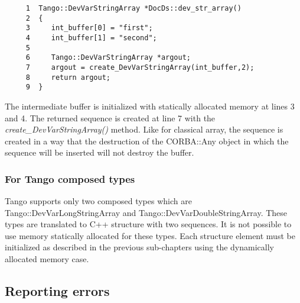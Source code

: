 \begin{verbatim}
     1  Tango::DevVarStringArray *DocDs::dev_str_array()
     2  {
     3     int_buffer[0] = "first";
     4     int_buffer[1] = "second";
     5  
     6     Tango::DevVarStringArray *argout;
     7     argout = create_DevVarStringArray(int_buffer,2);
     8     return argout;
     9  }
\end{verbatim}


The intermediate buffer is initialized with statically allocated memory
at lines 3 and 4. The returned sequence is created at line 7 with
the \emph{create\_DevVarStringArray()}
method. Like for classical array, the sequence is created in a way
that the destruction of the CORBA::Any object in which
the sequence will be inserted will not destroy the buffer.


\subsubsection{For Tango composed types}

Tango supports only two composed types which are Tango::DevVarLongStringArray
and Tango::DevVarDoubleStringArray.
These types are translated to C++ structure with two sequences. It
is not possible to use memory statically allocated for these types.
Each structure element must be initialized as described in the previous
sub-chapters using the dynamically allocated memory case.


\subsection{Reporting errors}
\label{sub:Reporting-errors}

